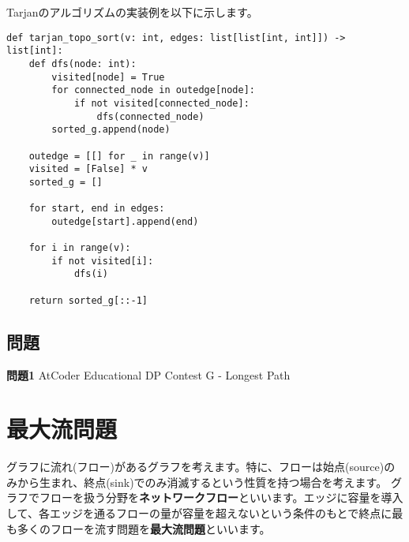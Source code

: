 \documentclass{jlreq}
\begin{document}
\vspace{0.5cm}

\begin{center}
\end{center}
\vspace{0.5cm}

Tarjanのアルゴリズムの実装例を以下に示します。

\begin{lstlisting}[caption=Tarjanのアルゴリズムの実装, label=tarjan, frame=TRBL, label={tarjan}]
def tarjan_topo_sort(v: int, edges: list[list[int, int]]) -> list[int]:
    def dfs(node: int):
        visited[node] = True
        for connected_node in outedge[node]:
            if not visited[connected_node]:
                dfs(connected_node)
        sorted_g.append(node)
    
    outedge = [[] for _ in range(v)]
    visited = [False] * v
    sorted_g = []
    
    for start, end in edges:
        outedge[start].append(end)
    
    for i in range(v):
        if not visited[i]:
            dfs(i)
    
    return sorted_g[::-1]
\end{lstlisting}

\subsection{問題}

\textbf{問題1} AtCoder Educational DP Contest G - Longest Path\\

\newpage

\section{最大流問題}
グラフに流れ(フロー)があるグラフを考えます。特に、フローは始点(source)のみから生まれ、終点(sink)でのみ消滅するという性質を持つ場合を考えます。
グラフでフローを扱う分野を\textbf{ネットワークフロー}といいます。エッジに容量を導入して、各エッジを通るフローの量が容量を超えないという条件のもとで終点に最も多くのフローを流す問題を\textbf{最大流問題}といいます。
\end{document}
